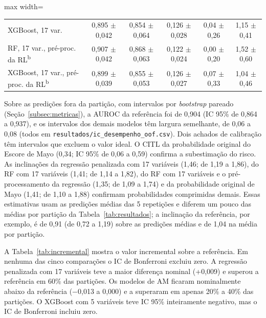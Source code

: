 \begin{table}[htbp]
\begin{adjustbox}{max width=\linewidth}
\begin{tabular}{@{}lccccc@{}}
XGBoost, 17 var. & 0,895 $\pm$ 0,042 & 0,854 $\pm$ 0,064 & 0,126 $\pm$ 0,028 & 0,04 $\pm$ 0,26 & 1,15 $\pm$ 0,41 \\
RF, 17 var., pré-proc. da RL\textsuperscript{b} & 0,907 $\pm$ 0,042 & 0,868 $\pm$ 0,063 & 0,122 $\pm$ 0,024 & 0,00 $\pm$ 0,20 & 1,52 $\pm$ 0,60 \\
XGBoost, 17 var., pré-proc. da RL\textsuperscript{b} & 0,899 $\pm$ 0,039 & 0,855 $\pm$ 0,053 & 0,126 $\pm$ 0,027 & 0,07 $\pm$ 0,33 & 1,04 $\pm$ 0,46 \\
\bottomrule
\end{tabular}
\end{adjustbox}
\par{}
\end{table}

Sobre as predições fora da partição, com intervalos por \textit{bootstrap} pareado (Seção~\ref{subsec:metricas}), a AUROC da referência foi de 0,904 (IC 95\% de 0,864 a 0,937), e os intervalos dos demais modelos têm largura semelhante, de 0,06 a 0,08 (todos em \texttt{resultados/ic\_desempenho\_oof.csv}). Dois achados de calibração têm intervalos que excluem o valor ideal. O CITL da probabilidade original do Escore de Mayo (0,34; IC 95\% de 0,06 a 0,59) confirma a subestimação do risco. As inclinações da regressão penalizada com 17 variáveis (1,46; de 1,19 a 1,86), do RF com 17 variáveis (1,41; de 1,14 a 1,82), do RF com 17 variáveis e o pré-processamento da regressão (1,35; de 1,09 a 1,74) e da probabilidade original de Mayo (1,41; de 1,10 a 1,88) confirmam probabilidades comprimidas demais. Essas estimativas usam as predições médias das 5 repetições e diferem um pouco das médias por partição da Tabela~\ref{tab:resultados}; a inclinação da referência, por exemplo, é de 0,91 (de 0,72 a 1,19) sobre as predições médias e de 1,04 na média por partição.

A Tabela~\ref{tab:incremental} mostra o valor incremental sobre a referência. Em nenhuma das cinco comparações o IC de Bonferroni excluiu zero. A regressão penalizada com 17 variáveis teve a maior diferença nominal (+0,009) e superou a referência em 60\% das partições. Os modelos de AM ficaram nominalmente abaixo da referência ($-$0,013 a 0,000) e a superaram em apenas 20\% a 40\% das partições. O XGBoost com 5 variáveis teve IC 95\% inteiramente negativo, mas o IC de Bonferroni incluiu zero.

